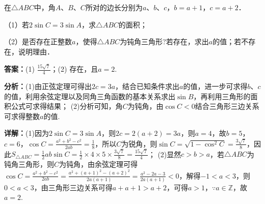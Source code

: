 \begin{question}[points=12]
在$\triangle ABC$中，角$A$、$B$、$C$所对的边长分别为$a$、$b$、$c$，$b=a+1$，$c=a+2$．

（1）若$2\sin C=3\sin A$，求$\triangle ABC$的面积；

（2）是否存在正整数$a$，使得$\triangle ABC$为钝角三角形?若存在，求出$a$的值；若不存在，说明理由．
\begin{solution}
\textbf{答案：}(1) $\frac{15\sqrt{7}}{4}$；(2) 存在，且$a=2$.

\textbf{分析：}(1)由正弦定理可得出$2c=3a$，结合已知条件求出$a$的值，进一步可求得$b$、$c$的值，利用余弦定理以及同角三角函数的基本关系求出$\sin B$，再利用三角形的面积公式可求得结果； (2)分析可知，角$C$为钝角，由$\cos C<0$结合三角形三边关系可求得整数$a$的值.

\textbf{详解：}(1)因为$2\sin C=3\sin A$，则$2c=2(a+2)=3a$，则$a=4$，故$b=5$，$c=6$，$\cos C=\frac{a^2+b^2-c^2}{2ab}=\frac{1}{8}$，所以$C$为锐角，则$\sin C=\sqrt{1-\cos^2 C}=\frac{3\sqrt{7}}{8}$，因此$S_{\triangle ABC}=\frac{1}{2}ab\sin C=\frac{1}{2}\times4\times5\times\frac{3\sqrt{7}}{8}=\frac{15\sqrt{7}}{4}$； (2)显然$c>b>a$，若$\triangle ABC$为钝角三角形，则$C$为钝角，由余弦定理可得$\cos C=\frac{a^2+b^2-c^2}{2ab}=\frac{a^2+(a+1)^2-(a+2)^2}{2a(a+1)}=\frac{a^2-2a-3}{2a(a+1)}<0$，解得$-1<a<3$，则$0<a<3$，由三角形三边关系可得$a+a+1>a+2$，可得$a>1$，$\because a\in\mathbb{Z}$，故$a=2$.
\end{solution}
\end{question}

